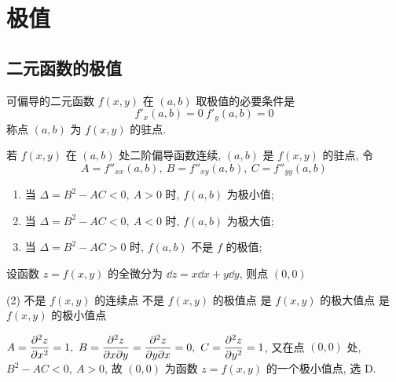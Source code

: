 \section{极值}

\subsection{二元函数的极值}

\begin{theorem}[二元函数取极值的必要条件]
    可偏导的二元函数 $f(x,y)$ 在 $(a,b)$ 取极值的必要条件是
    $$f'_x(a,b)=0~  f'_y(a,b)=0$$
    称点 $(a,b)$ 为 $f(x,y)$ 的驻点.
\end{theorem}

\begin{theorem}[二元函数取极值的充分条件]
    若 $f(x,y)$ 在 $(a,b)$ 处二阶偏导函数连续, $(a,b)$ 是 $f(x,y)$ 的驻点, 令
    $$A=f''_{xx}(a,b),~  B=f''_{xy}(a,b),~  C=f''_{yy}(a,b)$$
    \begin{enumerate}[label=(\arabic{*})]
        \item 当 $\Delta=B^2-AC<0,~A>0$ 时, $f(a,b)$ 为极小值;
        \item 当 $\Delta=B^2-AC<0,~A<0$ 时, $f(a,b)$ 为极大值;
        \item 当 $\Delta=B^2-AC>0$ 时, $f(a,b)$ 不是 $f$ 的极值;
    \end{enumerate}
\end{theorem}

\begin{example}[2009 数二]
    设函数 $z=f(x,y)$ 的全微分为 $\dd z=x\dd x+y\dd y$, 则点 $(0,0)$
    \begin{tasks}(2)
        \task 不是 $f(x,y)$ 的连续点
        \task 不是 $f(x,y)$ 的极值点
        \task 是 $f(x,y)$ 的极大值点
        \task 是 $f(x,y)$ 的极小值点
    \end{tasks}
\end{example}
\begin{solution}
    $\displaystyle A=\pdv[2]{z}{x}=1,~B=\pdv{z}{x}{y}=\pdv{z}{y}{x}=0,~C=\pdv[2]{z}{y}=1$, 又在点 $(0,0)$ 处, $B^2-AC<0,~A>0$, 故 $(0,0)$ 为函数 $z=f(x,y)$ 的一个极小值点, 选 D.
\end{solution}

